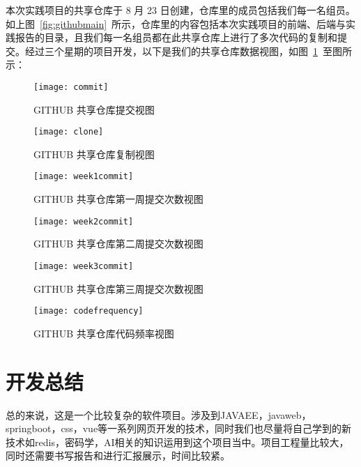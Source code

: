 本次实践项目的共享仓库于 8 月 23 日创建，仓库里的成员包括我们每一名组员。如上图~\ref{fig:githubmain}~所示，仓库里的内容包括本次实践项目的前端、后端与实践报告的目录，且我们每一名组员都在此共享仓库上进行了多次代码的复制和提交。经过三个星期的项目开发，以下是我们的共享仓库数据视图，如图~\ref{fig:commit}~至图所示：

\begin{figure}[htbp]
    \centering
    \texttt{[image: commit]}
    \caption{GITHUB 共享仓库提交视图}\label{fig:commit}
    \vspace{\baselineskip}
\end{figure}
\begin{figure}[htbp]
    \centering
    \texttt{[image: clone]}
    \caption{GITHUB 共享仓库复制视图}\label{fig:clone}
    \vspace{\baselineskip}
\end{figure}
\begin{figure}[htbp]
    \centering
    \texttt{[image: week1commit]}
    \caption{GITHUB 共享仓库第一周提交次数视图}\label{fig:week1commit}
    \vspace{\baselineskip}
\end{figure}
\begin{figure}[htbp]
    \centering
    \texttt{[image: week2commit]}
    \caption{GITHUB 共享仓库第二周提交次数视图}\label{fig:week2commit}
    \vspace{\baselineskip}
\end{figure}
\begin{figure}[htbp]
    \centering
    \texttt{[image: week3commit]}
    \caption{GITHUB 共享仓库第三周提交次数视图}\label{fig:week3commit}
    \vspace{\baselineskip}
\end{figure}
\begin{figure}[htbp]
    \centering
    \texttt{[image: codefrequency]}
    \caption{GITHUB 共享仓库代码频率视图}\label{fig:codefrequency}
    \vspace{\baselineskip}
\end{figure}

\section{开发总结}
总的来说，这是一个比较复杂的软件项目。涉及到JAVAEE，javaweb，springboot，css，vue等一系列网页开发的技术，同时我们也尽量将自己学到的新技术如redis，密码学，AI相关的知识运用到这个项目当中。项目工程量比较大，同时还需要书写报告和进行汇报展示，时间比较紧。

